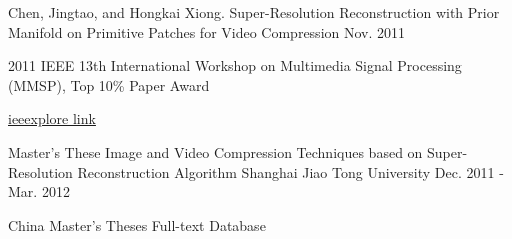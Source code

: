 

\begin{cventries}

  \cventry
    {Chen, Jingtao, and Hongkai Xiong.} %
    {Super-Resolution Reconstruction with Prior Manifold on Primitive Patches for Video Compression} %
    {} %
    {Nov. 2011} %
    {
      \begin{cvitems} %
        \item {2011 IEEE 13th International Workshop on Multimedia Signal Processing (MMSP), Top 10\% Paper Award}
        \item {\href{http://ieeexplore.ieee.org/abstract/document/6093849/}{ieeexplore link}}
      \end{cvitems}
    }

  \cventry
    {Master's These} %
    {Image and Video Compression Techniques based on Super-Resolution Reconstruction Algorithm} %
    {Shanghai Jiao Tong University} %
    {Dec. 2011 - Mar. 2012} %
    {
      \begin{cvitems} %
        \item {China Master’s Theses Full-text Database}
      \end{cvitems}
    }

\end{cventries}
